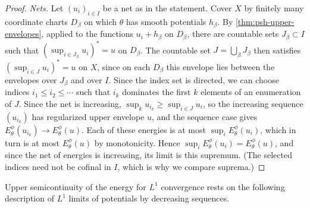 \begin{proof}
\emph{Nets.} Let $(u_i)_{i\in I}$ be a net as in the statement. Cover $X$ by finitely many coordinate charts $D_\beta$ on which $\theta$ has smooth potentials $h_\beta$. By \cref{thm:psh-upper-envelopes}, applied to the functions $u_i+h_\beta$ on $D_\beta$, there are countable sets $J_\beta\subset I$ such that $(\sup_{i\in J_\beta}u_i)^*=u$ on $D_\beta$. The countable set $J=\bigcup_\beta J_\beta$ then satisfies $(\sup_{i\in J}u_i)^*=u$ on $X$, since on each $D_\beta$ this envelope lies between the envelopes over $J_\beta$ and over $I$. Since the index set is directed, we can choose indices $i_1\leq i_2\leq\cdots$ such that $i_k$ dominates the first $k$ elements of an enumeration of $J$. Since the net is increasing, $\sup_ku_{i_k}\geq\sup_{i\in J}u_i$, so the increasing sequence $(u_{i_k})$ has regularized upper envelope $u$, and the sequence case gives $E_\theta^\phi(u_{i_k})\to E_\theta^\phi(u)$. Each of these energies is at most $\sup_iE_\theta^\phi(u_i)$, which in turn is at most $E_\theta^\phi(u)$ by monotonicity. Hence $\sup_iE_\theta^\phi(u_i)=E_\theta^\phi(u)$, and since the net of energies is increasing, its limit is this supremum. (The selected indices need not be cofinal in $I$, which is why we compare suprema.)
\end{proof}

Upper semicontinuity of the energy for $L^1$ convergence rests on the following description of $L^1$ limits of potentials by decreasing sequences.

